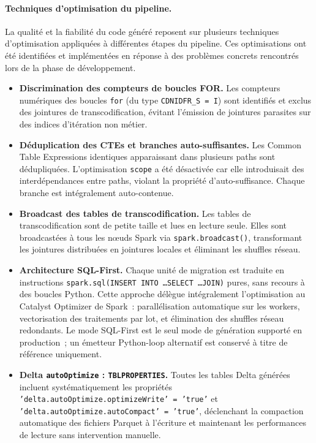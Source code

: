 \paragraph{Techniques d'optimisation du pipeline.}
La qualité et la fiabilité du code généré reposent sur plusieurs techniques d'optimisation appliquées à différentes étapes du pipeline. Ces optimisations ont été identifiées et implémentées en réponse à des problèmes concrets rencontrés lors de la phase de développement.

\begin{itemize}[leftmargin=*]

\item \textbf{Discrimination des compteurs de boucles FOR.}
Les compteurs numériques des boucles \texttt{for} (du type \texttt{CDNIDFR\_S~=~I}) sont identifiés et exclus des jointures de transcodification, évitant l'émission de jointures parasites sur des indices d'itération non métier.

\item \textbf{Déduplication des CTEs et branches auto-suffisantes.}
Les Common Table Expressions identiques apparaissant dans plusieurs paths sont dédupliquées. L'optimisation \texttt{scope} a été désactivée car elle introduisait des interdépendances entre paths, violant la propriété d'auto-suffisance. Chaque branche est intégralement auto-contenue.

\item \textbf{Broadcast des tables de transcodification.}
Les tables de transcodification sont de petite taille et lues en lecture seule. Elles sont broadcastées à tous les nœuds Spark via \texttt{spark.broadcast()}, transformant les jointures distribuées en jointures locales et éliminant les shuffles réseau.

\item \textbf{Architecture SQL-First.}
Chaque unité de migration est traduite en instructions \texttt{spark.sql(INSERT INTO \ldots SELECT \ldots JOIN)} pures, sans recours à des boucles Python. Cette approche délègue intégralement l'optimisation au Catalyst Optimizer de Spark~: parallélisation automatique sur les workers, vectorisation des traitements par lot, et élimination des shuffles réseau redondants. Le mode SQL-First est le seul mode de génération supporté en production~; un émetteur Python-loop alternatif est conservé à titre de référence uniquement.

\item \textbf{Delta \texttt{autoOptimize} : \texttt{TBLPROPERTIES}.}
Toutes les tables Delta générées incluent systématiquement les propriétés \texttt{'delta.auto\-Optimize.optimize\-Write'~=~'true'} et \texttt{'delta.auto\-Optimize.auto\-Compact'~=~'true'}, déclenchant la compaction automatique des fichiers Parquet à l'écriture et maintenant les performances de lecture sans intervention manuelle.

\end{itemize}

